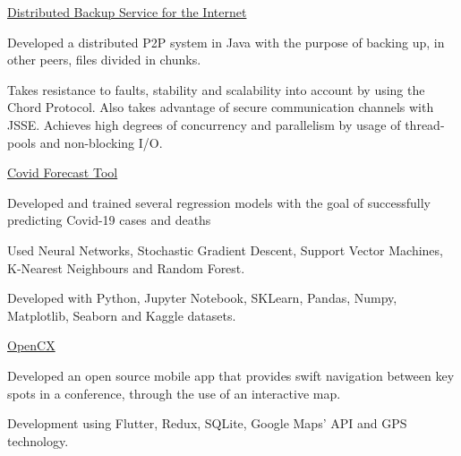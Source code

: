 
\begin{cventries}

  \cventry
  {} %
  {\href{https://github.com/MiguelDelPinto/distributed-backup-service/tree/master/proj2}{Distributed Backup Service for the Internet}} %
  {} %
  {} %
  {
    \begin{cvitems} %
      \item {Developed a distributed P2P system in Java with the purpose of backing up, in other peers, files divided in chunks.}
      \item {Takes resistance to faults, stability and scalability into account by using the Chord Protocol. Also takes advantage of secure communication channels with JSSE. Achieves high degrees of concurrency and parallelism by usage of thread-pools and non-blocking I/O.}
    \end{cvitems}
  }

  \cventry
  {} %
  {\href{https://github.com/MiguelDelPinto/feup-iart/tree/master/proj2}{Covid Forecast Tool}} %
  {} %
  {} %
  {
    \begin{cvitems} %
      \item {Developed and trained several regression models with the goal of successfully predicting Covid-19 cases and deaths}
      \item {Used Neural Networks, Stochastic Gradient Descent, Support Vector Machines, K-Nearest Neighbours and Random Forest.      }
      \item {Developed with Python, Jupyter Notebook, SKLearn, Pandas, Numpy, Matplotlib, Seaborn and Kaggle datasets.}
    \end{cvitems}
  }

  \cventry
    {} %
    {\href{https://github.com/softeng-feup/open-cx}{OpenCX}} %
    {} %
    {} %
    {
      \begin{cvitems} %
      	\item {Developed an open source mobile app that provides swift navigation between key spots in a conference, through the use of an interactive map.}
		    \item {Development using Flutter, Redux, SQLite, Google Maps' API and GPS technology.}
      \end{cvitems}
    }

\end{cventries}